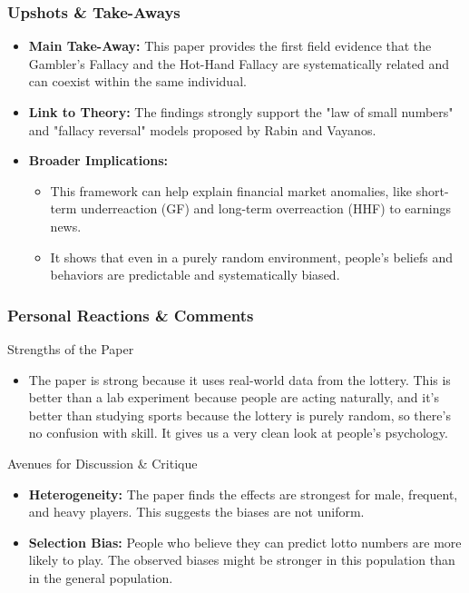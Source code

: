 \documentclass{beamer}
\begin{document}
\begin{frame}
    \frametitle{Upshots \& Take-Aways}
    \begin{itemize}
        \item \textbf{Main Take-Away:} This paper provides the first field evidence that the Gambler's Fallacy and the Hot-Hand Fallacy are systematically related and can coexist within the same individual.
        \vspace{1em}
        \item \textbf{Link to Theory:} The findings strongly support the "law of small numbers" and "fallacy reversal" models proposed by Rabin and Vayanos.
        \vspace{1em}
        \item \textbf{Broader Implications:}
        \begin{itemize}
            \item This framework can help explain financial market anomalies, like short-term underreaction (GF) and long-term overreaction (HHF) to earnings news.
            \item It shows that even in a purely random environment, people's beliefs and behaviors are predictable and systematically biased.
        \end{itemize}
    \end{itemize}
\end{frame}

\begin{frame}
    \frametitle{Personal Reactions \& Comments}
    \begin{alertblock}{Strengths of the Paper}
        \begin{itemize}
            \item The paper is strong because it uses real-world data from the lottery. This is better than a lab experiment because people are acting naturally, and it's better than studying sports because the lottery is purely random, so there's no confusion with skill. It gives us a very clean look at people's psychology.
        \end{itemize}
    \end{alertblock}
    \vspace{1em}
    \begin{exampleblock}{Avenues for Discussion \& Critique}
        \begin{itemize}
            \item \textbf{Heterogeneity:} The paper finds the effects are strongest for male, frequent, and heavy players. This suggests the biases are not uniform.
            \item \textbf{Selection Bias:} People who believe they can predict lotto numbers are more likely to play. The observed biases might be stronger in this population than in the general population.
        \end{itemize}
    \end{exampleblock}
\end{frame}
\end{document}
